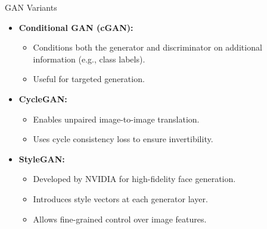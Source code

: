\begin{frame}[allowframebreaks]{GAN Variants}
\begin{itemize}
\framebreak

        \item \textbf{Conditional GAN (cGAN):} 
        \begin{itemize}
            \item Conditions both the generator and discriminator on additional information (e.g., class labels).
            \item Useful for targeted generation.
        \end{itemize}
        \item \textbf{CycleGAN:} 
        \begin{itemize}
            \item Enables unpaired image-to-image translation.
            \item Uses cycle consistency loss to ensure invertibility.
        \end{itemize}
        \item \textbf{StyleGAN:} 
        \begin{itemize}
            \item Developed by NVIDIA for high-fidelity face generation.
            \item Introduces style vectors at each generator layer.
            \item Allows fine-grained control over image features.
        \end{itemize}
    \end{itemize}
\end{frame}






